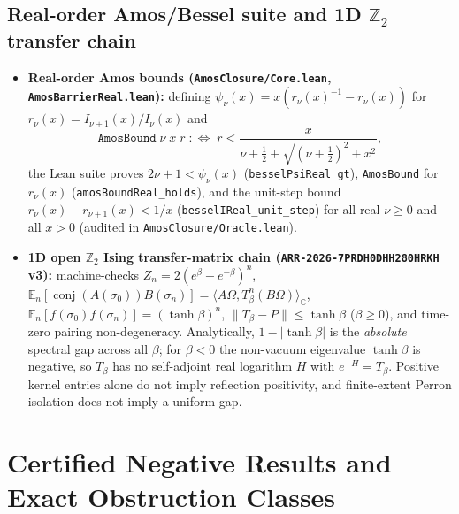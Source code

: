 \documentclass[11pt]{article}
\newcommand{\Z}{\mathbb{Z}}
\newcommand{\C}{\mathbb{C}}
\newcommand{\Om}{\Omega}
\newcommand{\Ex}{\mathbb{E}}
\newcommand{\conj}[1]{\operatorname{conj}(#1)}
\begin{document}
\subsection{Real-order Amos/Bessel suite and 1D $\Z_2$ transfer chain}
\begin{itemize}
  \item \textbf{Real-order Amos bounds (\texttt{AmosClosure/Core.lean}, \texttt{AmosBarrierReal.lean}):}
  defining $\psi_\nu(x) = x(r_\nu(x)^{-1} - r_\nu(x))$ for
  $r_\nu(x) = I_{\nu+1}(x)/I_\nu(x)$ and
  \[
    \texttt{AmosBound}\;\nu\;x\;r \;:\Longleftrightarrow\;
    r < \frac{x}{\nu + \tfrac{1}{2} + \sqrt{(\nu+\tfrac{1}{2})^2 + x^2}},
  \]
  the Lean suite proves $2\nu + 1 < \psi_\nu(x)$ (\nolinkurl{besselPsiReal_gt}),
  \texttt{AmosBound} for $r_\nu(x)$ (\nolinkurl{amosBoundReal_holds}), and the unit-step
  bound $r_\nu(x) - r_{\nu+1}(x) < 1/x$ (\nolinkurl{besselIReal_unit_step}) for all real
  $\nu \ge 0$ and all $x > 0$ (audited in \texttt{AmosClosure/Oracle.lean}).
  \item \textbf{1D open $\Z_2$ Ising transfer-matrix chain (\texttt{ARR-2026-7PRDH0DHH280HRKH} v3):}
  machine-checks $Z_n = 2(e^\beta+e^{-\beta})^n$,
  $\Ex_n[\conj{A(\sigma_0)}B(\sigma_n)] = \langle A\Om, T_\beta^n(B\Om)\rangle_\C$,
  $\Ex_n[f(\sigma_0)f(\sigma_n)] = (\tanh\beta)^n$, $\|T_\beta - P\| \le \tanh\beta$
  ($\beta \ge 0$), and time-zero pairing non-degeneracy. Analytically, $1 - |\tanh\beta|$ is
  the \emph{absolute} spectral gap across all $\beta$; for $\beta < 0$ the non-vacuum
  eigenvalue $\tanh\beta$ is negative, so $T_\beta$ has no self-adjoint real logarithm
  $H$ with $e^{-H} = T_\beta$. Positive kernel entries alone do not imply reflection
  positivity, and finite-extent Perron isolation does not imply a uniform gap.
\end{itemize}

\section{Certified Negative Results and Exact Obstruction Classes}\label{sec:obstructions}
\end{document}
